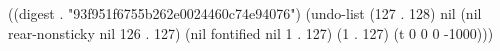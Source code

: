 
((digest . "93f951f6755b262e0024460c74e94076") (undo-list (127 . 128) nil (nil rear-nonsticky nil 126 . 127) (nil fontified nil 1 . 127) (1 . 127) (t 0 0 0 -1000)))
